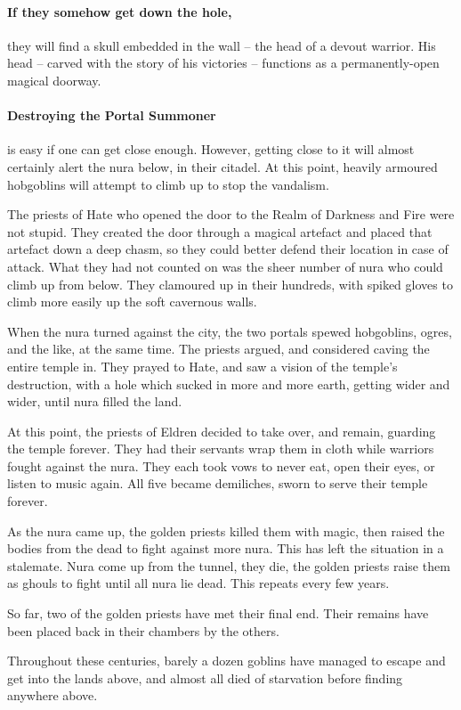 \paragraph{If they somehow get down the hole,}
they will find a skull embedded in the wall -- the head of a devout warrior.
His head -- carved with the story of his victories -- functions as a permanently-open magical doorway.


\paragraph{Destroying the Portal Summoner}
is easy if one can get close enough.
However, getting close to it will almost certainly alert the nura below, in their citadel.
At this point, heavily armoured hobgoblins will attempt to climb up to stop the vandalism.

\hobgoblin

\begin{exampletext}

  The priests of Hate who opened the door to the Realm of Darkness and Fire%
  \iftoggle{aif}{%
    \footnote{See page \pageref{darknessandfire} for more on that realm.}
  }{}%
 were not stupid.
 They created the door through a magical artefact and placed that artefact down a deep chasm, so they could better defend their location in case of attack.
  What they had not counted on was the sheer number of nura who could climb up from below.
  They clamoured up in their hundreds, with spiked gloves to climb more easily up the soft cavernous walls.

  When the nura turned against the city, the two portals spewed hobgoblins, ogres, and the like, at the same time.
  The priests argued, and considered caving the entire temple in.
  They prayed to Hate, and saw a vision of the temple's destruction, with a hole which sucked in more and more earth, getting wider and wider, until nura filled the land.

  At this point, the priests of Eldren decided to take over, and remain, guarding the temple forever.
  They had their servants wrap them in cloth while warriors fought against the nura.
  They each took vows to never eat, open their eyes, or listen to music again.
  All five became demiliches, sworn to serve their temple forever.

  As the nura came up, the golden priests killed them with magic, then raised the bodies from the dead to fight against more nura.
  This has left the situation in a stalemate.
  Nura come up from the tunnel, they die, the golden priests raise them as ghouls to fight until all nura lie dead.
  This repeats every few years.

  So far, two of the golden priests have met their final end.
  Their remains have been placed back in their chambers by the others.

  Throughout these centuries, barely a dozen goblins have managed to escape and get into the lands above, and almost all died of starvation before finding anywhere above.

\end{exampletext}

